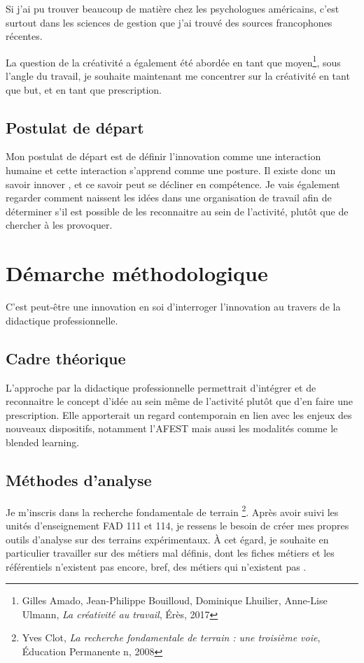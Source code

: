 \documentclass{article}
\begin{document}
Si j'ai pu trouver beaucoup de matière chez les psychologues américains, c'est surtout dans les sciences de gestion que j'ai trouvé des sources francophones récentes.

La question de la créativité a également été abordée en tant que moyen\footnote{Gilles Amado, Jean-Philippe Bouilloud, Dominique Lhuilier, Anne-Lise Ulmann, \textit{La créativité au travail}, Érès, 2017}, sous l'angle du travail, je souhaite maintenant me concentrer sur la créativité en tant que but, et en tant que prescription.

\subsection{Postulat de départ}

Mon postulat de départ est de définir l'innovation comme une interaction humaine et cette interaction s'apprend comme une posture. Il existe donc un \og savoir innover \fg{}, et ce savoir peut se décliner en compétence. 
Je vais également regarder comment naissent les idées dans une organisation de travail afin de déterminer s'il est possible de les reconnaitre au sein de l'activité, plutôt que de chercher à les provoquer. 

\section{Démarche méthodologique}

C'est peut-être une innovation en soi d'interroger l'innovation au travers de la didactique professionnelle.

\subsection{Cadre théorique}

L'approche par la didactique professionnelle permettrait d'intégrer et de reconnaitre le concept d'idée au sein même de l'activité plutôt que d'en faire une prescription. Elle apporterait un regard contemporain en lien avec les enjeux des nouveaux dispositifs, notamment l'AFEST mais aussi les modalités comme le blended learning.

\subsection{Méthodes d'analyse}

Je m'inscris dans la recherche fondamentale de terrain \footnote{Yves Clot, \emph{La recherche fondamentale de terrain : une troisième voie}, Éducation Permanente n, 2008}. Après avoir suivi les unités d'enseignement FAD 111 et 114, je ressens le besoin de créer mes propres outils d'analyse sur des terrains expérimentaux. À cet égard, je souhaite en particulier travailler sur des métiers mal définis, dont les fiches métiers et les référentiels n'existent pas encore, bref, des métiers \og qui n'existent pas \fg{}.
\end{document}
